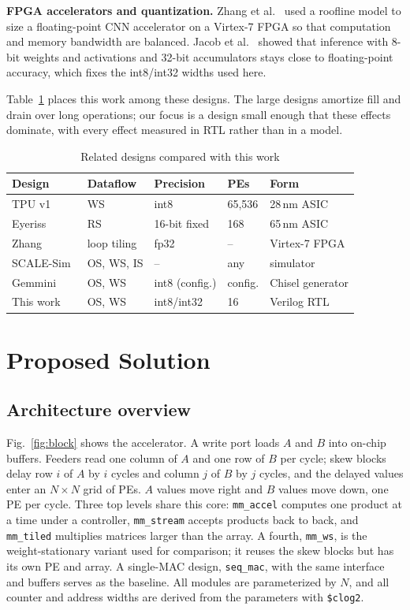 \documentclass[conference]{IEEEtran}
\newcommand{\code}[1]{\texttt{#1}}
\begin{document}
\textbf{FPGA accelerators and quantization.} Zhang et al.~\cite{zhang2015} used a roofline model to size a floating-point CNN accelerator on a Virtex-7 FPGA so that computation and memory bandwidth are balanced. Jacob et al.~\cite{jacob2018} showed that inference with 8-bit weights and activations and 32-bit accumulators stays close to floating-point accuracy, which fixes the int8/int32 widths used here.

Table~\ref{tab:related} places this work among these designs. The large designs amortize fill and drain over long operations; our focus is a design small enough that these effects dominate, with every effect measured in RTL rather than in a model.

\begin{table}[t]
\centering
\caption{Related designs compared with this work}
\label{tab:related}
\setlength{\tabcolsep}{3pt}
\begin{tabular}{lllll}
\toprule
Design & Dataflow & Precision & PEs & Form \\
\midrule
TPU v1~\cite{jouppi2017} & WS & int8 & 65,536 & 28\,nm ASIC \\
Eyeriss~\cite{chen2017} & RS & 16-bit fixed & 168 & 65\,nm ASIC \\
Zhang~\cite{zhang2015} & loop tiling & fp32 & -- & Virtex-7 FPGA \\
SCALE-Sim~\cite{samajdar2018} & OS, WS, IS & -- & any & simulator \\
Gemmini~\cite{genc2021} & OS, WS & int8 (config.) & config. & Chisel generator \\
This work & OS, WS & int8/int32 & 16 & Verilog RTL \\
\bottomrule
\end{tabular}
\end{table}

\section{Proposed Solution}
\label{sec:design}

\subsection{Architecture overview}
Fig.~\ref{fig:block} shows the accelerator. A write port loads $A$ and $B$ into on-chip buffers. Feeders read one column of $A$ and one row of $B$ per cycle; skew blocks delay row $i$ of $A$ by $i$ cycles and column $j$ of $B$ by $j$ cycles, and the delayed values enter an $N\times N$ grid of PEs. $A$ values move right and $B$ values move down, one PE per cycle. Three top levels share this core: \code{mm\_accel} computes one product at a time under a controller, \code{mm\_stream} accepts products back to back, and \code{mm\_tiled} multiplies matrices larger than the array. A fourth, \code{mm\_ws}, is the weight-stationary variant used for comparison; it reuses the skew blocks but has its own PE and array. A single-MAC design, \code{seq\_mac}, with the same interface and buffers serves as the baseline. All modules are parameterized by $N$, and all counter and address widths are derived from the parameters with \code{\$clog2}.
\end{document}
